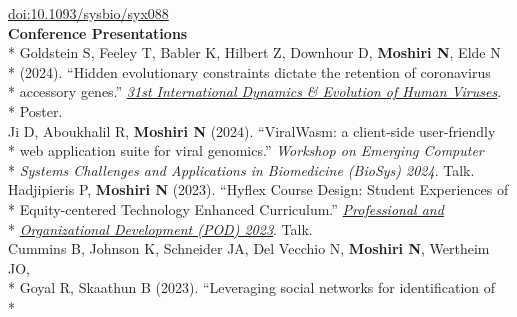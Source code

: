 \documentclass[margin,line]{res}
\begin{document}
\begin{resume}
\hspace*{8mm} \href{https://doi.org/10.1093/sysbio/syx088}{doi:10.1093/sysbio/syx088}
~\\
\textbf{Conference Presentations}\vspace{2mm}\\*
\hspace*{4mm} Goldstein S, Feeley T, Babler K, Hilbert Z, Downhour D, \textbf{Moshiri N}, Elde N\\*
\hspace*{9mm} (2024). ``Hidden evolutionary constraints dictate the retention of coronavirus\\*
\hspace*{9mm} accessory genes.'' \href{https://cpd.ucsd.edu/hivdynamics/}{\textit{31st International Dynamics \& Evolution of Human Viruses}}.\\*\vspace{2mm}
\hspace*{8mm} Poster.\\
\hspace*{4mm} Ji D, Aboukhalil R, \textbf{Moshiri N} (2024). ``ViralWasm: a client-side user-friendly\\*
\hspace*{9mm} web application suite for viral genomics.'' \textit{Workshop on Emerging Computer}\\*\vspace{2mm}
\hspace*{8mm} \textit{Systems Challenges and Applications in Biomedicine (BioSys) 2024}. Talk.\\
\hspace*{4mm} Hadjipieris P, \textbf{Moshiri N} (2023). ``Hyflex Course Design: Student Experiences of\\*
\hspace*{9mm} Equity-centered Technology Enhanced Curriculum.'' \href{https://podnetwork.org/48th-annual-conference/}{\textit{Professional and}}\\*\vspace{2mm}
\hspace*{8mm} \href{https://podnetwork.org/48th-annual-conference/}{\textit{Organizational Development (POD) 2023}}. Talk.\\
\hspace*{4mm} Cummins B, Johnson K, Schneider JA, Del Vecchio N, \textbf{Moshiri N}, Wertheim JO,\\*
\hspace*{9mm} Goyal R, Skaathun B (2023). ``Leveraging social networks for identification of\\*

\end{resume}
\end{document}
